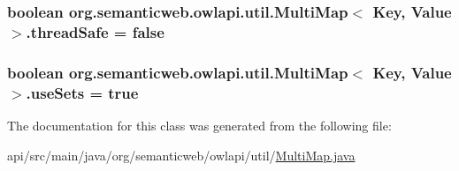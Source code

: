 \hypertarget{classorg_1_1semanticweb_1_1owlapi_1_1util_1_1_multi_map_3_01_key_00_01_value_01_4_a972fc408021234551d0ba45af4425a70}{
\subsubsection[{thread\-Safe}]{\setlength{\rightskip}{0pt plus 5cm}boolean org.\-semanticweb.\-owlapi.\-util.\-Multi\-Map$<$ Key, Value $>$.thread\-Safe = false\hspace{0.3cm}{\ttfamily [private]}}}\label{classorg_1_1semanticweb_1_1owlapi_1_1util_1_1_multi_map_3_01_key_00_01_value_01_4_a972fc408021234551d0ba45af4425a70}
\hypertarget{classorg_1_1semanticweb_1_1owlapi_1_1util_1_1_multi_map_3_01_key_00_01_value_01_4_a5911e692ddf07ededda42d43d06b0215}{
\subsubsection[{use\-Sets}]{\setlength{\rightskip}{0pt plus 5cm}boolean org.\-semanticweb.\-owlapi.\-util.\-Multi\-Map$<$ Key, Value $>$.use\-Sets = true\hspace{0.3cm}{\ttfamily [private]}}}\label{classorg_1_1semanticweb_1_1owlapi_1_1util_1_1_multi_map_3_01_key_00_01_value_01_4_a5911e692ddf07ededda42d43d06b0215}


The documentation for this class was generated from the following file\-:\begin{DoxyCompactItemize}
\item 
api/src/main/java/org/semanticweb/owlapi/util/\hyperlink{_multi_map_8java}{Multi\-Map.\-java}\end{DoxyCompactItemize}
